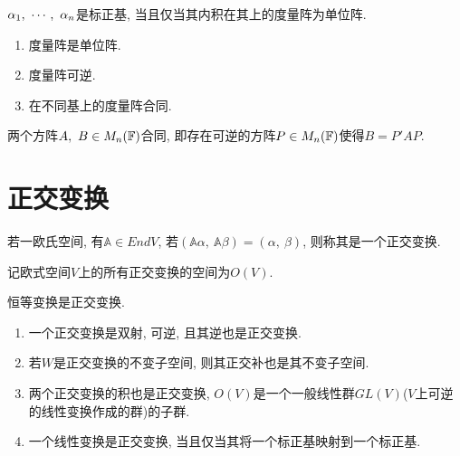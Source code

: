 \begin{example}
    ${\alpha}{_1},\ \cdots,\ {\alpha}{_{n}}$是标正基, 当且仅当其内积在其上的度量阵为单位阵.
\end{example}

\begin{property}
    \par
    \begin{enumerate}[itemindent=1em]
        \item 度量阵是单位阵.
        \item 度量阵可逆.
        \item 在不同基上的度量阵合同.
    \end{enumerate}
\end{property}

\begin{definition}[合同]
    两个方阵$A,\ B\in M_{n}(\mathbb{F})$合同, 即存在可逆的方阵$P\in M_{n}(\mathbb{F})$使得$B=P'AP$.
\end{definition}


\section{ 正交变换 }

\begin{definition}[正交变换]
    若一欧氏空间, 有$\mathbb{A}\in EndV$, 若$(\mathbb{A}\alpha,\ \mathbb{A}\beta)=(\alpha,\ \beta)$, 则称其是一个正交变换.\par
    记欧式空间$V$上的所有正交变换的空间为$O(V)$.
\end{definition}

\begin{example}
    恒等变换是正交变换.
\end{example}

\begin{property}
    \par
    \begin{enumerate}[itemindent=1em]
        \item 一个正交变换是双射, 可逆, 且其逆也是正交变换.
        \item 若$W$是正交变换的不变子空间, 则其正交补也是其不变子空间.
        \item 两个正交变换的积也是正交变换, $O(V)$是一个一般线性群$GL(V)$($V$上可逆的线性变换作成的群)的子群.
        \item 一个线性变换是正交变换, 当且仅当其将一个标正基映射到一个标正基.
    \end{enumerate}
\end{property}

